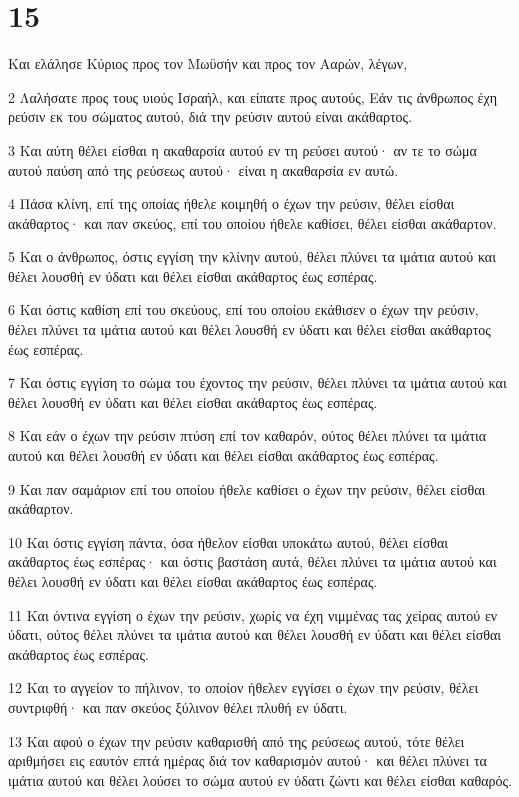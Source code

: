 \chapter{15}

\par Και ελάλησε Κύριος προς τον Μωϋσήν και προς τον Ααρών, λέγων,
\par 2 Λαλήσατε προς τους υιούς Ισραήλ, και είπατε προς αυτούς, Εάν τις άνθρωπος έχη ρεύσιν εκ του σώματος αυτού, διά την ρεύσιν αυτού είναι ακάθαρτος.
\par 3 Και αύτη θέλει είσθαι η ακαθαρσία αυτού εν τη ρεύσει αυτού· αν τε το σώμα αυτού παύση από της ρεύσεως αυτού· είναι η ακαθαρσία εν αυτώ.
\par 4 Πάσα κλίνη, επί της οποίας ήθελε κοιμηθή ο έχων την ρεύσιν, θέλει είσθαι ακάθαρτος· και παν σκεύος, επί του οποίου ήθελε καθίσει, θέλει είσθαι ακάθαρτον.
\par 5 Και ο άνθρωπος, όστις εγγίση την κλίνην αυτού, θέλει πλύνει τα ιμάτια αυτού και θέλει λουσθή εν ύδατι και θέλει είσθαι ακάθαρτος έως εσπέρας.
\par 6 Και όστις καθίση επί του σκεύους, επί του οποίου εκάθισεν ο έχων την ρεύσιν, θέλει πλύνει τα ιμάτια αυτού και θέλει λουσθή εν ύδατι και θέλει είσθαι ακάθαρτος έως εσπέρας.
\par 7 Και όστις εγγίση το σώμα του έχοντος την ρεύσιν, θέλει πλύνει τα ιμάτια αυτού και θέλει λουσθή εν ύδατι και θέλει είσθαι ακάθαρτος έως εσπέρας.
\par 8 Και εάν ο έχων την ρεύσιν πτύση επί τον καθαρόν, ούτος θέλει πλύνει τα ιμάτια αυτού και θέλει λουσθή εν ύδατι και θέλει είσθαι ακάθαρτος έως εσπέρας.
\par 9 Και παν σαμάριον επί του οποίου ήθελε καθίσει ο έχων την ρεύσιν, θέλει είσθαι ακάθαρτον.
\par 10 Και όστις εγγίση πάντα, όσα ήθελον είσθαι υποκάτω αυτού, θέλει είσθαι ακάθαρτος έως εσπέρας· και όστις βαστάση αυτά, θέλει πλύνει τα ιμάτια αυτού και θέλει λουσθή εν ύδατι και θέλει είσθαι ακάθαρτος έως εσπέρας.
\par 11 Και όντινα εγγίση ο έχων την ρεύσιν, χωρίς να έχη νιμμένας τας χείρας αυτού εν ύδατι, ούτος θέλει πλύνει τα ιμάτια αυτού και θέλει λουσθή εν ύδατι και θέλει είσθαι ακάθαρτος έως εσπέρας.
\par 12 Και το αγγείον το πήλινον, το οποίον ήθελεν εγγίσει ο έχων την ρεύσιν, θέλει συντριφθή· και παν σκεύος ξύλινον θέλει πλυθή εν ύδατι.
\par 13 Και αφού ο έχων την ρεύσιν καθαρισθή από της ρεύσεως αυτού, τότε θέλει αριθμήσει εις εαυτόν επτά ημέρας διά τον καθαρισμόν αυτού· και θέλει πλύνει τα ιμάτια αυτού και θέλει λούσει το σώμα αυτού εν ύδατι ζώντι και θέλει είσθαι καθαρός.
